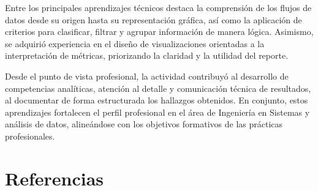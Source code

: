 \documentclass[12pt]{article}
\begin{document}
Entre los principales aprendizajes técnicos destaca la comprensión de los flujos de datos desde su origen hasta su representación gráfica, así como la aplicación de criterios para clasificar, filtrar y agrupar información de manera lógica. Asimismo, se adquirió experiencia en el diseño de visualizaciones orientadas a la interpretación de métricas, priorizando la claridad y la utilidad del reporte.

Desde el punto de vista profesional, la actividad contribuyó al desarrollo de competencias analíticas, atención al detalle y comunicación técnica de resultados, al documentar de forma estructurada los hallazgos obtenidos. En conjunto, estos aprendizajes fortalecen el perfil profesional en el área de Ingeniería en Sistemas y análisis de datos, alineándose con los objetivos formativos de las prácticas profesionales.


\section*{Referencias}
\end{document}
